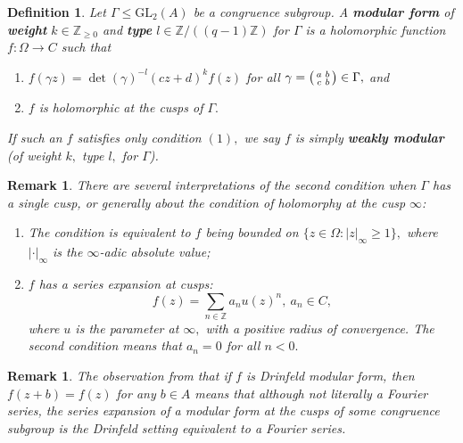 \documentclass[11pt]{amsart}
\newtheorem{definition}[theorem]{Definition}
\newtheorem{remark}[theorem]{Remark}
\theoremstyle{definition}
\newenvironment{psmallmatrix}
{\left(\begin{smallmatrix}}
	{\end{smallmatrix}\right)}
\numberwithin{equation}{section}
\newcommand{\GL}{\mathrm{GL}} 	%
\newcommand{\bbZ}{\mathbb{Z}}		%
\begin{document}
		\begin{definition}\cite[Definition $(3.1)$]{Gekeler-Curves}
		\label{def: Drinfeld modular form}
			Let $\Gamma\leq \GL_2(A)$ be a congruence subgroup. A \textbf{modular form} of \textbf{weight} $k\in \bbZ_{\geq0}$ and \textbf{type} $l\in \bbZ/((q-1) \bbZ)$ for $\Gamma$ is a holomorphic function $f:\Omega\to C$ such that 
			\begin{enumerate}
				\item $f(\gamma z)=\det(\gamma)^{-l}(cz+d)^kf(z)$ for all $\displaystyle{\gamma=\begin{psmallmatrix}a&b\\c&b\end{psmallmatrix}\in \Gamma},$ and
				\item $f$ is holomorphic at the cusps of $\Gamma.$
			\end{enumerate}
			If such an $f$ satisfies only condition $(1),$ we say $f$ is simply \textbf{weakly modular} (of weight $k,$ type $l,$ for $\Gamma$).
		\end{definition}
		
		\begin{remark}
			There are several interpretations of the second condition when $\Gamma$ has a single cusp, or generally about the condition of holomorphy at the cusp $\infty$:
			\begin{enumerate}
				\item \cite[$(2.2.\mathrm{iii})$]{Gekeler-Invariants} The condition is equivalent to $f$ being bounded on $\{z\in \Omega:|z|_{\infty}\geq 1\},$ where $|\cdot|_{\infty}$ is the $\infty$-adic absolute value; 
				\item \cite[Definition $3.5.(\mathrm{iii})$]{Gekeler-survey-Drinfeld-modular-forms} $f$ has a series expansion at cusps: 
				\[f(z)=\sum_{n\in \bbZ}a_nu(z)^n, ~a_n\in C,\]
				where $u$ is the parameter at $\infty,$ with a positive radius of convergence. The second condition means that $a_n=0$ for all $n<0.$
			\end{enumerate}
		\end{remark}
		
		\begin{remark}
			The observation from \cite[Definition $(5.7)$]{Gekeler-Coeff} that if $f$ is Drinfeld modular form, then $f(z+b)=f(z)$ for any $b\in A$ means that although not literally a Fourier series, the series expansion of a modular form at the cusps of some congruence subgroup is the Drinfeld setting equivalent to a Fourier series.   
		\end{remark}
		
\end{document}
